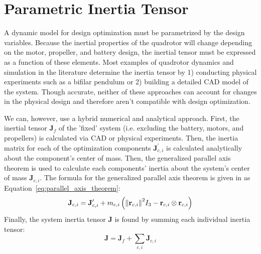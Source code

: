 \documentclass{article}
\begin{document}
	\section*{Parametric Inertia Tensor}
		A dynamic model for design optimization must be parametrized by the design variables.  Because the inertial properties of the quadrotor will change depending on the motor, propeller, and battery design, the inertial tensor must be expressed as a function of these elements.  Most examples of quadrotor dynamics and simulation in the literature determine the inertia tensor  by 1) conducting physical experiments such as a bifilar pendulum \cite{quanIntroductionMulticopterDesign2017} or 2) building a detailed CAD model of the system.  Though accurate, neither of these approaches can account for changes in the physical design and therefore aren't compatible with design optimization.  
		\par We can, however, use a hybrid numerical and analytical approach.  First, the inertial tensor $\mathbf{J}_{f}$ of the 'fixed' system (i.e. excluding the battery, motors, and propellers) is calculated via CAD or physical experiments. Then, the inertia matrix for each of the optimization components $\mathbf{J}_{c,i}^{\prime}$ is calculated analytically about the component's center of mass. Then, the generalized parallel axis theorem is used to calculate each components' inertia about the system's center of mass $\mathbf{J}_{c,i}$.  The formula for the generalized parallel axis theorem is given in \cite{ParallelAxisTheorem2021} as Equation~\ref{eq:parallel_axis_theorem}:
		\begin{equation}
			\mathbf{J}_{c,i} = \mathbf{J}_{c,i}^{\prime} + m_{c,i}\left(\norm{\mathbf{r}_{c,i}}^2 I_3 - \mathbf{r}_{c,i} \otimes \mathbf{r}_{c,i} \right)
			\label{eq:parallel_axis_theorem}
		\end{equation}
		Finally, the system inertia tensor $\mathbf{J}$ is found by summing each individual inertia tensor:
		\begin{equation}
		\mathbf{J} = \mathbf{J}_f + \sum_{c,i}{\mathbf{J}_{c,i}}
		\label{eq:system_inertia_tensor}
		\end{equation}
		
\end{document}
